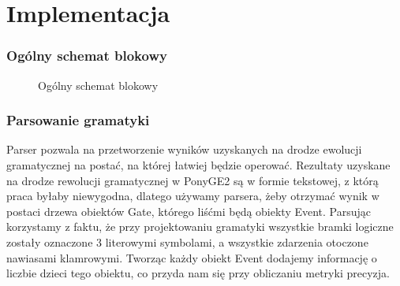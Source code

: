 \section{Implementacja}

\subsubsection{Ogólny schemat blokowy}
\clearpage

\begin{figure}[!ht]
	\caption{\label{fig:flow_chart}Ogólny schemat blokowy}
\end{figure}

\subsubsection{Parsowanie gramatyki}
Parser pozwala na przetworzenie wyników uzyskanych na drodze ewolucji gramatycznej na postać, na której łatwiej będzie operować. Rezultaty uzyskane na drodze rewolucji gramatycznej w PonyGE2 są w formie tekstowej, z którą praca byłaby niewygodna, dlatego używamy parsera, żeby otrzymać wynik w postaci drzewa obiektów Gate, którego liśćmi będą obiekty Event.
Parsując korzystamy z faktu, że przy projektowaniu gramatyki wszystkie bramki logiczne zostały oznaczone 3 literowymi symbolami, a wszystkie zdarzenia otoczone nawiasami klamrowymi. Tworząc każdy obiekt Event dodajemy informację o liczbie dzieci tego obiektu, co przyda nam się przy obliczaniu metryki precyzja.

